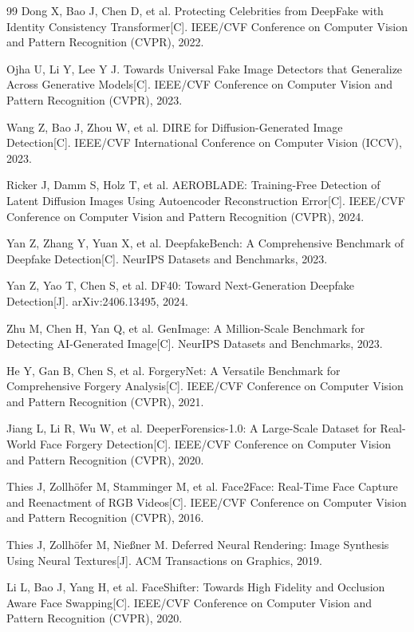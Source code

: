 \begin{thebibliography}{99}
 Dong X, Bao J, Chen D, et al. Protecting Celebrities from DeepFake with Identity Consistency Transformer[C]. IEEE/CVF Conference on Computer Vision and Pattern Recognition (CVPR), 2022.

 Ojha U, Li Y, Lee Y J. Towards Universal Fake Image Detectors that Generalize Across Generative Models[C]. IEEE/CVF Conference on Computer Vision and Pattern Recognition (CVPR), 2023.

 Wang Z, Bao J, Zhou W, et al. DIRE for Diffusion-Generated Image Detection[C]. IEEE/CVF International Conference on Computer Vision (ICCV), 2023.

 Ricker J, Damm S, Holz T, et al. AEROBLADE: Training-Free Detection of Latent Diffusion Images Using Autoencoder Reconstruction Error[C]. IEEE/CVF Conference on Computer Vision and Pattern Recognition (CVPR), 2024.

 Yan Z, Zhang Y, Yuan X, et al. DeepfakeBench: A Comprehensive Benchmark of Deepfake Detection[C]. NeurIPS Datasets and Benchmarks, 2023.

 Yan Z, Yao T, Chen S, et al. DF40: Toward Next-Generation Deepfake Detection[J]. arXiv:2406.13495, 2024.

 Zhu M, Chen H, Yan Q, et al. GenImage: A Million-Scale Benchmark for Detecting AI-Generated Image[C]. NeurIPS Datasets and Benchmarks, 2023.

 He Y, Gan B, Chen S, et al. ForgeryNet: A Versatile Benchmark for Comprehensive Forgery Analysis[C]. IEEE/CVF Conference on Computer Vision and Pattern Recognition (CVPR), 2021.

 Jiang L, Li R, Wu W, et al. DeeperForensics-1.0: A Large-Scale Dataset for Real-World Face Forgery Detection[C]. IEEE/CVF Conference on Computer Vision and Pattern Recognition (CVPR), 2020.

 Thies J, Zollh\"ofer M, Stamminger M, et al. Face2Face: Real-Time Face Capture and Reenactment of RGB Videos[C]. IEEE/CVF Conference on Computer Vision and Pattern Recognition (CVPR), 2016.

 Thies J, Zollh\"ofer M, Nie\ss{}ner M. Deferred Neural Rendering: Image Synthesis Using Neural Textures[J]. ACM Transactions on Graphics, 2019.

 Li L, Bao J, Yang H, et al. FaceShifter: Towards High Fidelity and Occlusion Aware Face Swapping[C]. IEEE/CVF Conference on Computer Vision and Pattern Recognition (CVPR), 2020.


\end{thebibliography}
